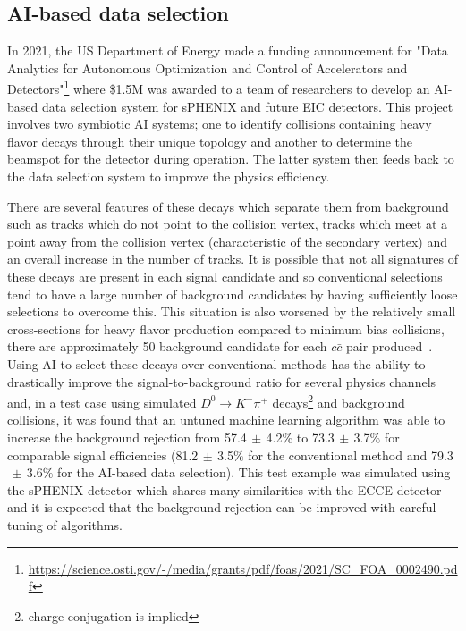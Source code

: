 \subsection{AI-based data selection}

In 2021, the US Department of Energy made a funding announcement for "Data Analytics for Autonomous Optimization and Control of Accelerators and Detectors"\footnote{\url{https://science.osti.gov/-/media/grants/pdf/foas/2021/SC_FOA_0002490.pdf}} where \$1.5M was awarded to a team of researchers to develop an AI-based data selection system for sPHENIX and future EIC detectors. This project involves two symbiotic AI systems; one to identify collisions containing heavy flavor decays through their unique topology and another to determine the beamspot for the detector during operation. The latter system then feeds back to the data selection system to improve the physics efficiency.

There are several features of these decays which separate them from background such as tracks which do not point to the collision vertex, tracks which meet at a point away from the collision vertex (characteristic of the secondary vertex) and an overall increase in the number of tracks. It is possible that not all signatures of these decays are present in each signal candidate and so conventional selections tend to have a large number of background candidates by having sufficiently loose selections to overcome this. This situation is also worsened by the relatively small cross-sections for heavy flavor production compared to minimum bias collisions, there are approximately 50 background candidate for each $c\bar{c}$ pair produced~\cite{jackson2016measurement, aaij2013prompt}. Using AI to select these decays over conventional methods has the ability to drastically improve the signal-to-background ratio for several physics channels and, in a test case using simulated $D^0\rightarrow K^-\pi^+$ decays\footnote{charge-conjugation is implied} and background collisions, it was found that an untuned machine learning algorithm was able to increase the background rejection from 57.4$\,\pm\,$4.2$\%$ to 73.3$\,\pm\,$3.7$\%$ for comparable signal efficiencies (81.2$\,\pm\,$3.5$\%$ for the conventional method and 79.3$\,\pm\,$3.6$\%$ for the AI-based data selection). This test example was simulated using the sPHENIX detector which shares many similarities with the ECCE detector and it is expected that the background rejection can be improved with careful tuning of algorithms.

